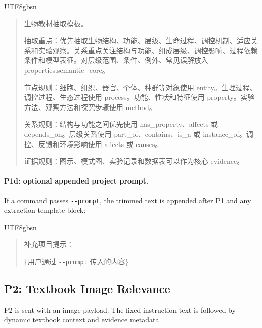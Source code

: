 \documentclass[11pt,letterpaper]{article}
\newcommand{\code}[1]{\nolinkurl{#1}}
\newenvironment{prompttranscript}{%
\begin{CJK}{UTF8}{gbsn}%
\begin{quote}%
\small%
\sloppy%
\setlength{\parskip}{0.35em}%
\setlength{\parindent}{0pt}%
}{%
\end{quote}%
\end{CJK}%
}
\newenvironment{prompttranscript}{%
\begin{quote}%
\small%
\sloppy%
\setlength{\parskip}{0.35em}%
\setlength{\parindent}{0pt}%
}{%
\end{quote}%
}
\begin{document}
\begin{prompttranscript}
生物教材抽取模板。\par
抽取重点：优先抽取生物结构、功能、层级、生命过程、调控机制、适应关系和实验观察。关系重点关注结构与功能、组成层级、调控影响、过程依赖条件和模型表征。对层级范围、条件、例外、常见误解放入 properties.semantic\_core。\par
节点规则：细胞、组织、器官、个体、种群等对象使用 entity。生理过程、调控过程、生态过程使用 process。功能、性状和特征使用 property。实验方法、观察方法和探究步骤使用 method。\par
关系规则：结构与功能之间优先使用 has\_property、affects 或 depends\_on。层级关系使用 part\_of、contains、is\_a 或 instance\_of。调控、反馈和环境影响使用 affects 或 causes。\par
证据规则：图示、模式图、实验记录和数据表可以作为核心 evidence。
\end{prompttranscript}

\paragraph{P1d: optional appended project prompt.}
If a command passes \code{--prompt}, the trimmed text is appended after P1 and any extraction-template block:

\begin{prompttranscript}
补充项目提示：\par
\{用户通过 \code{--prompt} 传入的内容\}
\end{prompttranscript}

\subsection{P2: Textbook Image Relevance}

P2 is sent with an image payload. The fixed instruction text is followed by dynamic textbook context and evidence metadata.
\end{document}
